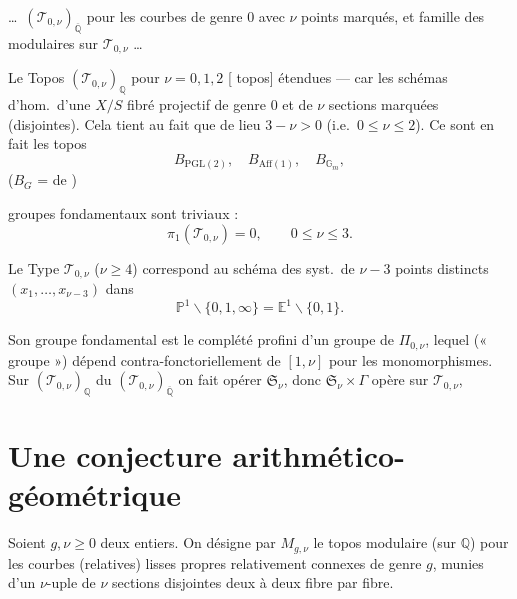 \documentclass[11pt,a4paper]{article}
\begin{document}
\ldots\ $(\mathcal{T}_{0,\nu})_{\overline{\mathbb{Q}}}$ pour les courbes de
genre $0$ avec $\nu$ points marqués, et famille des modulaires \ill{} \ill{}
sur $\mathcal{T}_{0,\nu}$ \ldots

Le Topos $(\mathcal{T}_{0,\nu})_{\mathbb{Q}}$ pour $\nu = 0, 1, 2$
 [ topos] étendues --- car les schémas \ill{}
d'hom.\ d'une $X/S$ fibré projectif de genre $0$ et de $\nu$ sections
marquées \ill{} (disjointes). Cela tient au fait que \ill{} de lieu \ill{}
$3 - \nu > 0$ (i.e.\ $0 \leqslant \nu \leqslant 2$). \struck{\ill{}} Ce sont en
fait les topos
\[
  B_{\mathrm{PGL}(2)}, \quad B_{\mathrm{Aff}(1)}, \quad B_{\mathbb{G}_m},
\]
($B_G$ =  de \ill{})


groupes fondamentaux sont triviaux :
\[
  \pi_1(\mathcal{T}_{0,\nu}) = 0, \qquad 0 \leqslant \nu \leqslant 3 .
\]

Le Type $\mathcal{T}_{0,\nu}$ ($\nu \geqslant 4$) correspond au
 schéma  des syst.\ de $\nu - 3$
points distincts $(x_1, \ldots, x_{\nu-3})$ dans
\[
  \mathbb{P}^1 \smallsetminus \{0, 1, \infty\} = \mathbb{E}^1 \smallsetminus \{0, 1\} .
\]

Son groupe fondamental est le complété profini d'un groupe de
 $\Pi_{0,\nu}$, lequel (« groupe \ill{} ») dépend
contra-fonctoriellement de $[1, \nu]$ pour les monomorphismes. Sur
$(\mathcal{T}_{0,\nu})_{\mathbb{Q}}$ du $(\mathcal{T}_{0,\nu})_{\overline{\mathbb{Q}}}$
on fait opérer $\mathfrak{S}_\nu$, donc $\mathfrak{S}_\nu \times \Gamma$ opère
sur $\mathcal{T}_{0,\nu}$,


\section*{Une conjecture arithmético-géométrique}



Soient $g, \nu \geqslant 0$ deux entiers. On désigne par $M_{g,\nu}$ le topos
modulaire (sur $\mathbb{Q}$) pour les courbes (relatives) lisses propres
relativement connexes de genre $g$, munies d'un $\nu$-uple 
de $\nu$ sections disjointes deux à deux fibre par fibre.
\end{document}
